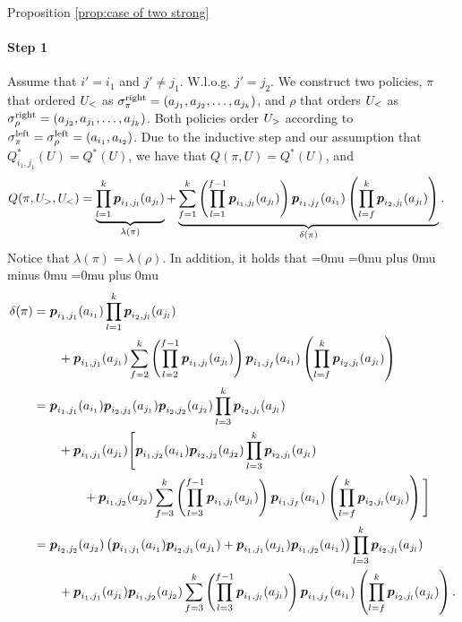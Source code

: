 \begin{proofof}{Proposition \ref{prop:case of two strong}}
\paragraph{Step 1} Assume that $i'=i_1$ and $j' \neq j_1$. W.l.o.g. $j'=j_2$. We construct two policies, $\pi$ that ordered $U_<$ as $\sigma^{\textnormal{right}}_\pi=(a_{j_1},a_{j_2},\dots, a_{j_{k}})$, and $\rho$ that orders $U_<$ as $\sigma^{\textnormal{right}}_\rho=(a_{j_2},a_{j_1},\dots,a_{j_{k}})$. Both policies order $U_>$ according to $\sigma^{\textnormal{left}}_\pi=\sigma^{\textnormal{left}}_\rho=(a_{i_1},a_{i_2})$. Due to the inductive step and our assumption that  $Q^*_{i_1,j_1}(U)=Q^*(U)$, we have that $Q(\pi,U)=Q^*(U)$, and
\begin{align*}
&Q(\pi,U_>,U_<) = \underbrace{\prod_{l=1}^{k} \boldsymbol{ p }_{{i_1},{j_l}}(a_{j_l})}_{\lambda(\pi)}
+ \underbrace{\sum_{f=1}^{k} \left(\prod_{l=1}^{f-1} \boldsymbol{ p }_{{i_1},{j_l}}(a_{j_l})\right) \boldsymbol{ p }_{{i_1},{j_f}}(a_{i_1}) \left(\prod_{l=f}^{k} \boldsymbol{ p }_{{i_2},{j_l}}(a_{j_l})\right)}_{\delta(\pi)}.
\end{align*}
Notice that $\lambda(\pi)=\lambda(\rho)$. In addition, it holds that
{\thinmuskip=0mu
\medmuskip=0mu plus 0mu minus 0mu
\thickmuskip=0mu plus 0mu
\begin{align}\label{eq:ind 2 step 1}
\delta(\pi)&=\bl p_{{i_1},{j_1}}(a_{i_1})\prod_{l=1}^{k} \bl p_{{i_2},{j_l}}(a_{j_l})\nonumber\\
&\qquad +\bl p_{{i_1},{j_1}}(a_{j_1})\sum_{f=2}^{k} \left(\prod_{l=2}^{f-1} \bl p_{{i_1},{j_l}}(a_{j_l})\right) \bl p_{{i_1},{j_f}}(a_{i_1}) \left(\prod_{l=f}^{k} \bl p_{{i_2},{j_l}}(a_{j_l})\right)\nonumber\\
& =\bl p_{{i_1},{j_1}}(a_{i_1})\bl p_{{i_2},{j_1}}(a_{j_1})\bl p_{{i_2},{j_2}}(a_{j_2})\prod_{l=3}^{k} \bl p_{{i_2},{j_l}}(a_{j_l})\nonumber\\
&\qquad+ \bl p_{{i_1},{j_1}}(a_{j_1})\Bigg[\bl p_{{i_1},{j_2}}(a_{i_1})\bl p_{{i_2},{j_2}}(a_{j_2})\prod_{l=3}^{k} \bl p_{{i_2},{j_l}}(a_{j_l})\nonumber\\
&\qquad \qquad+\bl p_{{i_1},{j_2}}(a_{j_2})  \sum_{f=3}^{k} \left(\prod_{l=3}^{f-1} \bl p_{{i_1},{j_l}}(a_{j_l})\right) \bl p_{{i_1},{j_f}}(a_{i_1}) \left(\prod_{l=f}^{k} \bl p_{{i_2},{j_l}}(a_{j_l})\right) \Bigg]\nonumber\\
&=\bl p_{{i_2},{j_2}}(a_{j_2})\left( \bl p_{{i_1},{j_1}}(a_{i_1})\bl p_{{i_2},{j_1}}(a_{j_1})+\bl p_{{i_1}
,{j_1}}(a_{j_1})\bl p_{{i_1},{j_2}}(a_{i_1})\right)\prod_{l=3}^{k} \bl p_{{i_2},{j_l}}(a_{j_l})\nonumber\\
&\qquad+ \bl p_{{i_1},{j_1}}(a_{j_1})\bl p_{{i_1},{j_2}}(a_{j_2})  \sum_{f=3}^{k} \left(\prod_{l=3}^{f-1} \bl p_{{i_1},{j_l}}(a_{j_l})\right) \bl p_{{i_1},{j_f}}(a_{i_1}) \left(\prod_{l=f}^{k} \bl p_{{i_2},{j_l}}(a_{j_l})\right).

\end{align}}
\end{proofof}
